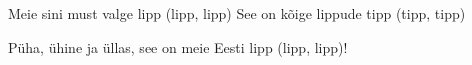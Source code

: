 Meie sini must valge lipp (lipp, lipp)
See on k\~oige lippude tipp (tipp, tipp)

P\"uha, \"uhine ja \"ullas, see on meie Eesti lipp (lipp, lipp)!